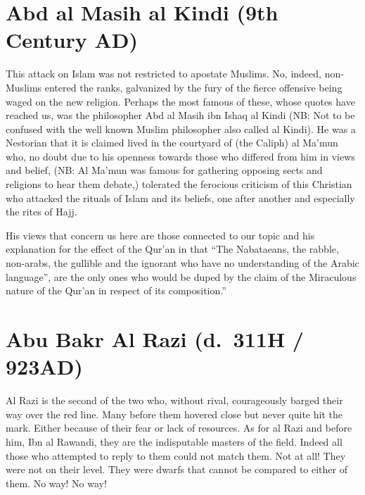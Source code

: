 \documentclass[12pt]{book}
\begin{document}


\section{Abd al Masih al Kindi (9th Century AD)}

This attack on Islam was not restricted to apostate Muslims. No, indeed,
non-Muslims entered the ranks, galvanized by the fury of the fierce offensive
being waged on the new religion. Perhaps the most famous of these, whose quotes
have reached us, was the philosopher Abd al Masih ibn Ishaq al Kindi
(NB: Not to be confused with the well known Muslim philosopher also called
al Kindi).
He was a Nestorian that it is claimed lived in the courtyard of (the Caliph)
al Ma’mun who, no doubt due to his openness towards those who differed from him
in views and belief,
(NB: Al Ma’mun was famous for gathering opposing sects and religions to hear
them debate,)
tolerated the ferocious criticism of this
Christian who attacked the rituals of Islam and its beliefs, one after another
and especially the rites of Hajj.

His views that concern us here are those connected to our topic and his
explanation for the effect of the Qur’an in that “The Nabataeans, the rabble,
non-arabs, the gullible and the ignorant who have no understanding of the
Arabic language”, are the only ones who would be duped by the claim of the
Miraculous nature of the Qur’an in respect of its composition.”\footnotemark



\section{Abu Bakr Al Razi (d.\ 311H / 923AD)}

Al Razi is the second of the two who, without rival,
courageously barged their way over the red line.
Many before them hovered close but never quite hit the mark.
Either because of their fear or lack of resources.
As for al Razi and before him, Ibn al Rawandi, they are the indisputable
masters of the field.
Indeed all those who attempted to reply to them could not match them.
Not at all! They were not on their level.
They were dwarfs that cannot be compared to either of them.
No way! No way!
\end{document}
